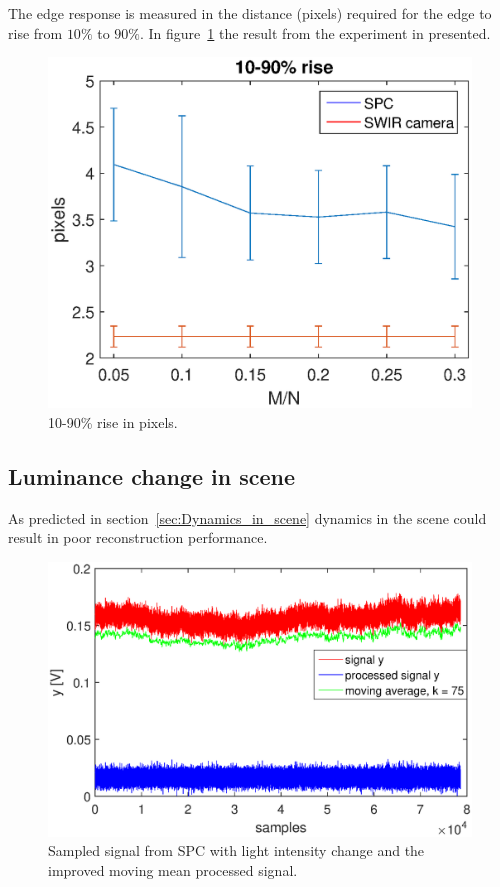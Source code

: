 The edge response is measured in the distance (pixels) required for the edge to rise from $10\%$ to $90\%$. In figure~\ref{fig:rise} the result from the experiment in presented. 

\begin{figure}[H]
    \centering
    \includegraphics[width=0.7\linewidth]{result/mtf/Rise10_90.eps}
    \caption{10-90\% rise in pixels.}
    \label{fig:rise}
\end{figure}


\subsection{Luminance change in scene}
As predicted in section~\ref{sec:Dynamics_in_scene} dynamics in the scene could result in poor reconstruction performance.  

\begin{figure}[H]
\includegraphics[width = 0.7\linewidth]{result/luminance/li.eps}
	\caption{Sampled signal from SPC with light intensity change and the improved moving mean processed signal.}
	\label{fig:lc_plot}
\end{figure}


